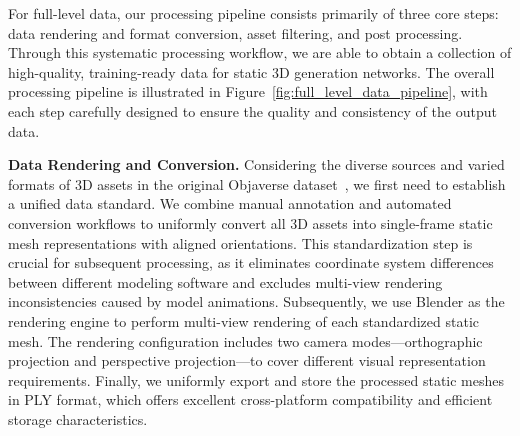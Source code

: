 \documentclass{article} %
\begin{document}
For full-level data, our processing pipeline consists primarily of three core steps: data rendering and format conversion, asset filtering, and post processing. Through this systematic processing workflow, we are able to obtain a collection of high-quality, training-ready data for static 3D generation networks. The overall processing pipeline is illustrated in Figure~\ref{fig:full_level_data_pipeline}, with each step carefully designed to ensure the quality and consistency of the output data.

\textbf{Data Rendering and Conversion.} Considering the diverse sources and varied formats of 3D assets in the original Objaverse dataset~\cite{objaverse,objaverseXL}, we first need to establish a unified data standard. 
We combine manual annotation and automated conversion workflows to uniformly convert all 3D assets into single-frame static mesh representations with aligned orientations.
This standardization step is crucial for subsequent processing, as it eliminates coordinate system differences between different modeling software and excludes multi-view rendering inconsistencies caused by model animations. Subsequently, we use Blender as the rendering engine to perform multi-view rendering of each standardized static mesh. The rendering configuration includes two camera modes—orthographic projection and perspective projection—to cover different visual representation requirements. Finally, we uniformly export and store the processed static meshes in PLY format, which offers excellent cross-platform compatibility and efficient storage characteristics.
\end{document}
